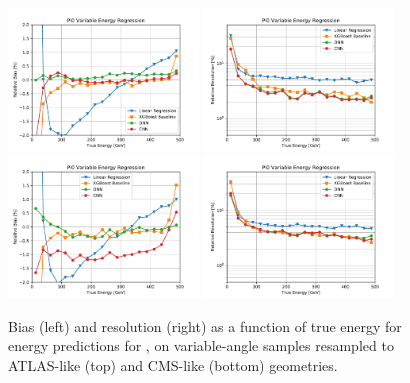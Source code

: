 \begin{figure}[htbp]
\centering
\includegraphics[width=0.45\textwidth]{Images/Calo/bias_vs_E_Pi0_variable_ATLAS.pdf}
\includegraphics[width=0.45\textwidth]{Images/Calo/res_vs_E_Pi0_variable_ATLAS.pdf} \\
\includegraphics[width=0.45\textwidth]{Images/Calo/bias_vs_E_Pi0_variable_CMS.pdf}
\includegraphics[width=0.45\textwidth]{Images/Calo/res_vs_E_Pi0_variable_CMS.pdf}
\caption{Bias (left) and resolution (right) as a function of true energy for energy predictions for \pizero, on variable-angle samples resampled to  ATLAS-like (top) and CMS-like (bottom) geometries.\label{fig:reg_resampled_pi0_ATLAS_CMS}}
\end{figure}